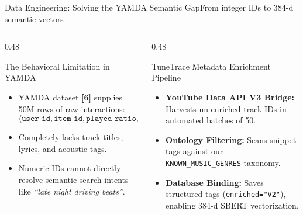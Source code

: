 \documentclass[aspectratio=169,10pt]{beamer}
\begin{document}
\begin{frame}{Data Engineering: Solving the YAMDA Semantic Gap}{From integer IDs to 384-d semantic vectors}
    \begin{columns}[T]
        \begin{column}{0.48\textwidth}
            \begin{alertblock}{The Behavioral Limitation in YAMDA}
                \begin{itemize}\small
                    \item YAMDA dataset \textbf{[6]} supplies 50M rows of raw interactions:
                    $$\langle \texttt{user\_id}, \texttt{item\_id}, \texttt{played\_ratio}, \texttt{timestamp} \rangle$$
                    \item Completely lacks track titles, lyrics, and acoustic tags.
                    \item Numeric IDs cannot directly resolve semantic search intents like \textit{``late night driving beats''}.
                \end{itemize}
            \end{alertblock}
        \end{column}

        \begin{column}{0.48\textwidth}
            \begin{exampleblock}{TuneTrace Metadata Enrichment Pipeline}
                \begin{itemize}\small
                    \item \textbf{YouTube Data API V3 Bridge:} Harvests un-enriched track IDs in automated batches of 50.
                    \item \textbf{Ontology Filtering:} Scans snippet tags against our \texttt{KNOWN\_MUSIC\_GENRES} taxonomy.
                    \item \textbf{Database Binding:} Saves structured tags (\texttt{enriched="V2"}), enabling 384-d SBERT vectorization.
                \end{itemize}
            \end{exampleblock}
        \end{column}
    \end{columns}
\end{frame}
\end{document}
